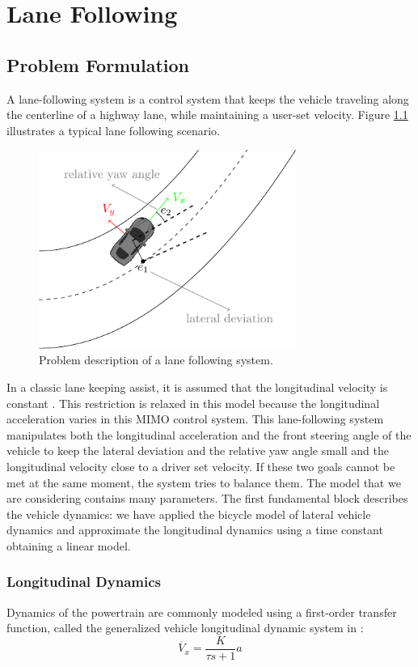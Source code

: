\chapter{Lane Following}
\section{Problem Formulation}
A lane-following system is a control system that keeps the vehicle traveling along the centerline of a highway lane, while maintaining a user-set velocity. Figure \ref{fig:laneFollowing} illustrates a typical lane following scenario.
\begin{figure}[!h]
	\centering
	\includegraphics[width=0.75\textwidth]{../figure/laneFollowing/laneFollowing.pdf}
	\caption{Problem description of a lane following system.}
	\label{fig:laneFollowing}
\end{figure}

In a classic lane keeping assist, it is assumed that the longitudinal velocity is constant \cite{Adaptive_Mpc_Lane_keeping_borelli}. This restriction is relaxed in this model because the longitudinal acceleration varies in this MIMO control system. This lane-following system manipulates both the longitudinal acceleration and the front steering angle of the vehicle to keep the lateral deviation and the relative yaw angle small and the longitudinal velocity close to a driver set velocity. If these two goals cannot be met at the same moment, the system tries to balance them. The model that we are considering contains many parameters. The first fundamental block describes the vehicle dynamics: we have applied the bicycle model of lateral vehicle dynamics and approximate the longitudinal dynamics using a time constant obtaining  a linear model.

\subsection{Longitudinal Dynamics}
Dynamics of the powertrain are commonly modeled using a first-order transfer function, called the generalized vehicle longitudinal dynamic system in \cite{longitudinal_paper}:
\begin{equation}
\label{eqn:longitudinal_transfer_function}
\dot{V_x} = \frac{K}{\tau s+1}a
\end{equation}

